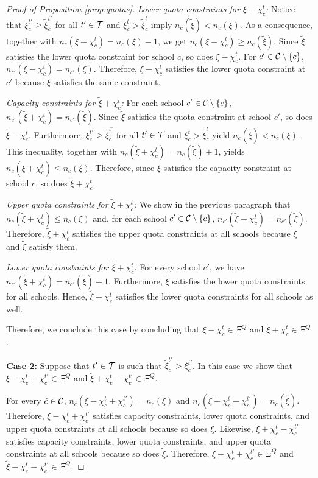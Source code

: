 \documentclass[12pt]{amsart}
\theoremstyle{remark}
\begin{document}
\begin{proof}[Proof of Proposition \ref{prop:quotas}]
\smallskip
\noindent \emph{Lower quota constraints for $\xi-\chi_c^t$:} Notice that $\xi_{c}^{t'} \geq \tilde{\xi}_{c}^{t'}$ for all $t' \in \mathcal{T}$ and
$\xi_c^t>\tilde{\xi}_{c}^{t}$ imply $n_c(\tilde \xi) < n_c(\xi)$. As a consequence, together with $n_c(\xi-\chi_c^t)=n_c(\xi)-1$,
we get $n_c(\xi-\chi_c^t)\geq n_c(\tilde \xi)$. Since $\tilde \xi$ satisfies the lower quota constraint for school $c$, so does $\xi-\chi_c^t$.
For $c'\in \mathcal{C} \setminus \{c\}$, $n_{c'}(\xi-\chi_c^t) = n_{c'}(\xi)$. Therefore, $\xi-\chi_c^t$ satisfies the lower quota constraint at
$c'$ because $\xi$ satisfies the same constraint.

\smallskip
\noindent \emph{Capacity constraints for $\tilde \xi+\chi_c^t$:} For each school $c' \in \mathcal{C} \setminus \{c\}$, $n_{c'}(\tilde \xi+\chi_c^t)=n_{c'}(\tilde \xi)$.
Since $\tilde \xi$ satisfies the quota constraint at school $c'$, so does $\tilde \xi-\chi_c^t$. Furthermore, $\xi_{c}^{t'} \geq \tilde{\xi}_{c}^{t'}$ for all
$t' \in \mathcal{T}$ and $\xi_c^t>\tilde{\xi}_{c}^{t}$ yield $n_c(\tilde \xi) < n_c(\xi)$. This inequality, together with $n_{c}(\tilde \xi+\chi_c^t)=n_{c}(\tilde \xi)+1$,
yields $n_{c}(\tilde \xi+\chi_c^t) \leq n_c(\xi)$. Therefore, since $\xi$ satisfies the capacity constraint at school $c$, so does
$\tilde \xi + \chi_c^t$.

\smallskip
\noindent \emph{Upper quota constraints for $\tilde \xi+\chi_c^t$:} We show in the previous paragraph that $n_{c}(\tilde \xi+\chi_c^t) \leq n_c(\xi)$
and, for each school $c' \in \mathcal{C} \setminus \{c\}$, $n_{c'}(\tilde \xi+\chi_c^t)=n_{c'}(\tilde \xi)$. Therefore, $\tilde \xi+\chi_c^t$
satisfies the upper quota constraints at all schools because $\xi$ and $\tilde \xi$ satisfy them.

\smallskip
\noindent \emph{Lower quota constraints for $\tilde \xi+\chi_c^t$:} For every school $c'$, we have $n_{c'}(\tilde \xi+\chi_c^t)=n_{c'}(\tilde \xi)+1$. Furthermore,
$\tilde \xi$ satisfies the lower quota constraints for all schools. Hence, $\tilde \xi+\chi_c^t$ satisfies the lower quota constraints for all schools as well.

\smallskip
Therefore, we conclude this case by concluding that $\xi-\chi_c^t \in \Xi^Q$ and $\tilde{\xi}+\chi_c^t \in \Xi^Q$.

\medskip
\textbf{Case 2:} Suppose that $t'\in \mathcal{T}$ is such that $\tilde{\xi}_{c}^{t'} > \xi_{c}^{t'}$. In this case
we show that $\xi-\chi_c^t+\chi_{c}^{t'} \in \Xi^Q$ and $\tilde{\xi}+\chi_c^t-\chi_{c}^{t'}\in \Xi^Q$.

For every $\hat c \in \mathcal{C}$, $n_{\hat c}(\xi-\chi_c^t+\chi_{c}^{t'}) = n_{\hat c}(\xi)$ and
$n_{\hat{c}}(\tilde{\xi}+\chi_c^t-\chi_{c}^{t'})=n_{\hat{c}}(\tilde \xi)$. Therefore, $\xi-\chi_c^t+\chi_{c}^{t'}$ satisfies
capacity constraints, lower quota constraints, and upper quota constraints at all schools because so does $\xi$. Likewise,
$\tilde{\xi}+\chi_c^t-\chi_{c}^{t'}$ satisfies capacity constraints, lower quota constraints, and upper quota constraints at all schools
because so does $\tilde \xi$. Therefore, $\xi-\chi_c^t+\chi_{c}^{t'} \in \Xi^Q$ and $\tilde{\xi}+\chi_c^t-\chi_{c}^{t'}\in \Xi^Q$.


\end{proof}
\end{document}
